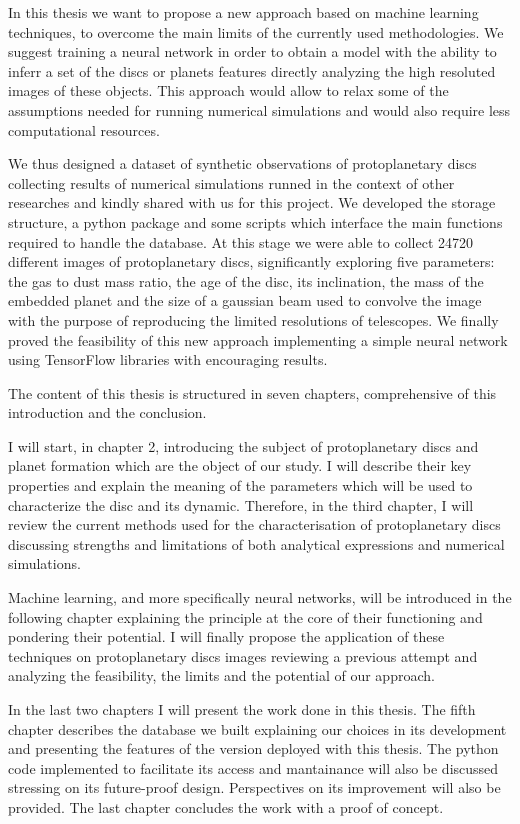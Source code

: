 \documentclass[a4paper,10pt]{report}
\begin{document}
In this thesis we want to propose a new approach based on machine learning techniques, to overcome 
the main limits of the currently used methodologies. We suggest training a neural network
in order to obtain a model with the ability to inferr a set of the discs or planets features directly
analyzing the high resoluted images of these objects. This approach would allow 
to relax some of the assumptions needed for running numerical simulations and would also require 
less computational resources.

We thus designed a dataset of synthetic observations of protoplanetary discs collecting
results of numerical simulations runned in the context of other researches and kindly shared with us
for this project. We developed the storage structure, a python package and some scripts which interface 
the main functions required to handle the database. At this stage we were able to collect 24720 different images 
of protoplanetary discs, significantly exploring five parameters: the gas to dust mass ratio, the age of the disc, its inclination, the mass of
the embedded planet and the size of a 
gaussian beam used to convolve the image with the purpose of reproducing the limited resolutions
of telescopes.
We finally proved the feasibility of this new approach implementing 
a simple neural network using TensorFlow libraries with encouraging results.

The content of this thesis is structured in seven chapters, comprehensive of this introduction and
the conclusion.

I will start, in chapter 2, introducing the subject of protoplanetary discs and planet formation which 
are the object of our study. I will describe their key properties and explain the meaning of the parameters 
which will be used to characterize the disc and its dynamic. Therefore, in the third chapter, I will review the current 
methods used for the characterisation of protoplanetary discs discussing strengths and limitations
of both analytical expressions and numerical simulations.

Machine learning, and more specifically neural networks, will 
be introduced in the following chapter explaining the principle at the core of their functioning and pondering 
their potential. I will finally propose the application of these techniques on protoplanetary discs images
reviewing a previous attempt \cite[S. Auddy and M. Lin]{Auddy_2020} and analyzing the feasibility, the limits and the potential of our approach.

In the last two chapters I will present the work done in this thesis. The fifth chapter describes the database we built
explaining our choices in its development and presenting the features of the version deployed with this thesis.
The python code implemented to facilitate its access and mantainance will also be discussed stressing on its future-proof design.
Perspectives on its improvement will also be provided.
The last chapter concludes the work with a proof of concept.
\end{document}
